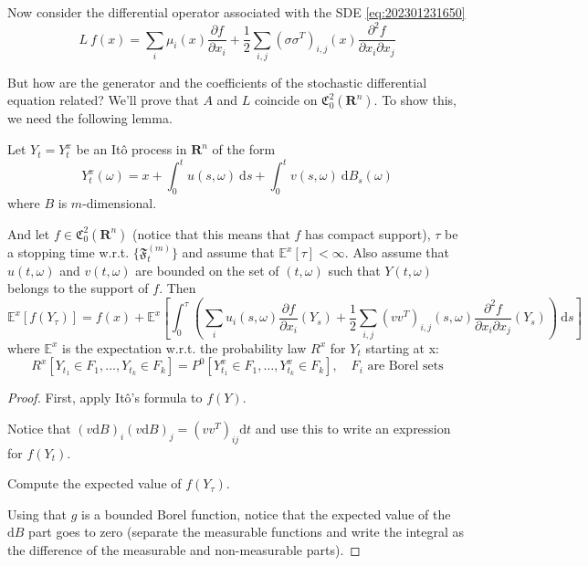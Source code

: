 Now consider the differential operator associated with the SDE \eqref{eq:202301231650}
\begin{equation*}
    L~f(x) = \sum_i \mu_i(x) \frac{\partial f}{\partial x_i} + \frac{1}{2} \sum_{i, j} (\sigma \sigma^T)_{i,j}(x) \frac{\partial^2 f}{\partial x_i \partial x_j}
\end{equation*}

But how are the generator and the coefficients of the stochastic differential equation related? We'll prove that $A$ and $L$ coincide on $\mathfrak{C}_0^2(\textbf{R}^n)$. To show this, we need the following lemma.

\begin{lemma}\label{lm:202301241653}
    Let $Y_t = Y_t^x$ be an Itô process in $\textbf{R}^n$ of the form 
    \[
        Y_t^x(\omega) = x + \int_0^t u(s,\omega) ~\mathrm{d}s + \int_0^t v(s,\omega) ~\mathrm{d}B_s(\omega)
    \]
    where $B$ is $m$-dimensional.

    And let $f \in \mathfrak{C}_0^2(\textbf{R}^n)$ (notice that this means that $f$ has compact support), $\tau$ be a stopping time w.r.t. $\{ \mathfrak{F}_t^{(m)} \}$ and assume that $\mathbb{E}^x[\tau] < \infty$. Also assume that $u(t, \omega)$ and $v(t, \omega)$ are bounded on the set of $(t, \omega)$ such that $Y(t, \omega)$ belongs to the support of $f$. Then 
    \[
        \mathbb{E}^x[f(Y_\tau)] = f(x) + \mathbb{E}^x\left[ \int_0^\tau \left( \sum_i u_i(s, \omega) \frac{\partial f}{\partial x_i}(Y_s) + \frac{1}{2} \sum_{i,j}(vv^T)_{i,j}(s, \omega) \frac{\partial^2 f}{\partial x_i \partial x_j}(Y_s) \right) ~\mathrm{d}s \right]
    \]
    where $\mathbb{E}^x$ is the expectation w.r.t. the probability law $R^x$ for $Y_t$ starting at x: 
    \[
        R^x[Y_{t_1} \in F_1, \ldots, Y_{t_k} \in F_k] = P^0[Y_{t_1}^x \in F_1, \ldots, Y_{t_k}^x \in F_k], \quad F_i \text{ are Borel sets}
    \]
\end{lemma}

\begin{proof}
    First, apply Itô's formula to $f(Y)$. 

    Notice that $(v \mathrm{d}B)_i (v \mathrm{d}B)_j = (v v^T)_{ij} \mathrm{d}t$ and use this to write an expression for $f(Y_t)$. 

    Compute the expected value of $f(Y_\tau)$.
    
    Using that $g$ is a bounded Borel function, notice that the expected value of the $\mathrm{d}B$ part goes to zero (separate the measurable functions and write the integral as the difference of the measurable and non-measurable parts). 
\end{proof}

